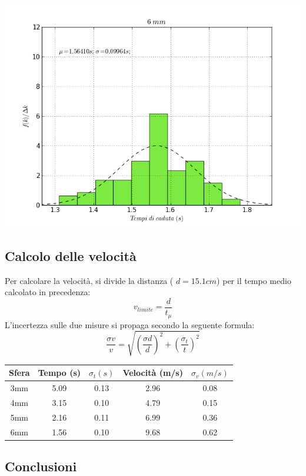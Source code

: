 \includegraphics[scale=0.4]{"../grafici/6mm"}

\subsection{Calcolo delle velocità}
Per calcolare la velocità, si divide la distanza ( $ d= 15.1 cm$) per il tempo medio calcolato in precedenza:
$$ v_{limite} = \frac{d}{t_{\mu}} $$
L'incertezza sulle due misure si propaga secondo la seguente formula:
\begin{equation}
\displaystyle \frac{\sigma v}{v} = \sqrt{\displaystyle (\frac{\sigma d}{d})^2 + \displaystyle (\frac{\sigma_t}{t})^2} 
\end{equation}

\begin{center}
\begin{tabular}{c|c|c|c|c}
Sfera & Tempo (s) & $\sigma_t (s) $ & Velocità (m/s) & $\sigma_v (m/s) $\\
\midrule
3mm & 5.09 & 0.13 & 2.96 & 0.08\\
4mm & 3.15 & 0.10 & 4.79 & 0.15\\
5mm & 2.16 & 0.11 & 6.99 & 0.36\\
6mm & 1.56 & 0.10 & 9.68 & 0.62\\

\end{tabular}
\end{center}



\subsection{Conclusioni}
